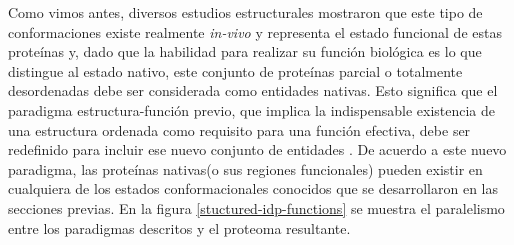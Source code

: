 Como vimos antes, diversos estudios estructurales mostraron que este tipo de conformaciones existe realmente \textit{in-vivo} y representa el estado funcional de estas proteínas y,
dado que la habilidad para realizar su función biológica es lo que distingue al estado nativo, este conjunto de proteínas parcial o totalmente desordenadas debe ser considerada como entidades nativas. 
Esto significa que el paradigma estructura-función previo, que implica la indispensable existencia de una estructura ordenada como requisito para una función efectiva, debe ser redefinido para incluir ese nuevo conjunto de entidades
\cite{wright1999intrinsically}.
De acuerdo a este nuevo paradigma, las proteínas nativas(o sus regiones funcionales) pueden existir en cualquiera de los estados conformacionales conocidos que se desarrollaron en las secciones previas.
En la figura \ref{stuctured-idp-functions} se muestra el paralelismo entre los paradigmas descritos y el proteoma resultante.

